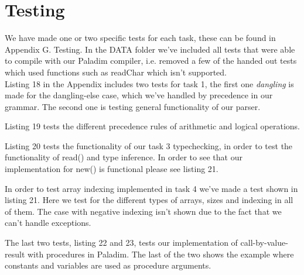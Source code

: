 \documentclass[12pt,a4paper,english]{article}
\begin{document}
\newpage
\section{Testing}
We have made one or two specific tests for each task, these can be found in Appendix G. Testing. In the DATA folder we've included all tests that were able to compile with our Paladim compiler, i.e. removed a few of the handed out tests which used functions such as readChar which isn't supported.\\

Listing 18 in the Appendix includes two tests for task 1, the first one \textit{dangling} is made for the dangling-else case, which we've handled by precedence in our grammar. The second one is testing general functionality of our parser.

Listing 19 tests the different precedence rules of arithmetic and logical operations.

Listing 20 tests the functionality of our task 3 typechecking, in order to test the functionality of read() and type inference. In order to see that our implementation for new() is functional please see listing 21.

In order to test array indexing implemented in task 4 we've made a test shown in listing 21. Here we test for the different types of arrays, sizes and indexing in all of them. The case with negative indexing isn't shown due to the fact that we can't handle exceptions.

The last two tests, listing 22 and 23, tests our implementation of call-by-value-result with procedures in Paladim. The last of the two shows the example where constants and variables are used as procedure arguments.

\newpage
\end{document}
